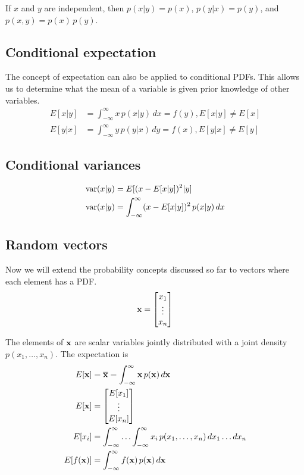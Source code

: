If $x$ and $y$ are independent, then $p(x|y) = p(x)$, $p(y|x) = p(y)$, and
$p(x, y) = p(x) \,p(y)$.

\subsection{Conditional expectation}

The concept of expectation can also be applied to conditional PDFs. This allows
us to determine what the mean of a variable is given prior knowledge of other
variables.
\begin{align*}
  E[x|y] &= \int_{-\infty}^\infty x \,p(x|y) \,dx = f(y), E[x|y] \neq E[x] \\
  E[y|x] &= \int_{-\infty}^\infty y \,p(y|x) \,dy = f(x), E[y|x] \neq E[y]
\end{align*}

\subsection{Conditional variances}
\begin{align*}
  \operatorname{var}(x|y) &= E[(x - E[x|y])^2|y] \\
  \operatorname{var}(x|y) &= \int_{-\infty}^\infty (x - E[x|y])^2 \,p(x|y) \,dx
\end{align*}

\subsection{Random vectors}

Now we will extend the probability concepts discussed so far to vectors where
each element has a PDF.
\begin{equation*}
  \mathbf{x} = \begin{bmatrix}
    x_1 \\
    \vdots \\
    x_n
  \end{bmatrix}
\end{equation*}

The elements of $\mathbf{x}$ are scalar variables jointly distributed with a joint
density $p(x_1, \ldots, x_n)$. The expectation is
\begin{align*}
  E[\mathbf{x}] &= \overline{\mathbf{x}} = \int_{-\infty}^\infty \mathbf{x} \,p(\mathbf{x})
    \,d\mathbf{x} \\
  E[\mathbf{x}] &= \begin{bmatrix}
    E[x_1] \\
    \vdots \\
    E[x_n]
  \end{bmatrix} \\
  E[x_i] &= \int_{-\infty}^\infty \ldots \int_{-\infty}^\infty x_i
    \,p(x_1, \ldots, x_n) \,dx_1 \ldots dx_n \\
  E[f(\mathbf{x})] &= \int_{-\infty}^\infty f(\mathbf{x}) \,p(\mathbf{x}) \,d\mathbf{x}
\end{align*}

